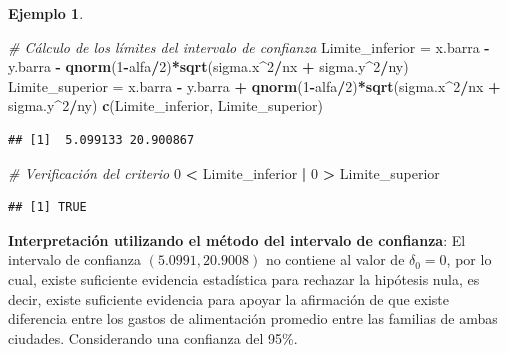 \documentclass[
  11pt,
]{book}
\newenvironment{Shaded}{\begin{snugshade}}{\end{snugshade}}
\newcommand{\CommentTok}[1]{\textcolor[rgb]{0.56,0.35,0.01}{\textit{#1}}}
\newcommand{\DecValTok}[1]{\textcolor[rgb]{0.00,0.00,0.81}{#1}}
\newcommand{\FunctionTok}[1]{\textcolor[rgb]{0.13,0.29,0.53}{\textbf{#1}}}
\newcommand{\NormalTok}[1]{#1}
\newcommand{\OtherTok}[1]{\textcolor[rgb]{0.56,0.35,0.01}{#1}}
\newcommand{\SpecialCharTok}[1]{\textcolor[rgb]{0.81,0.36,0.00}{\textbf{#1}}}
\theoremstyle{definition}
\theoremstyle{definition}
\newtheorem{example}{Ejemplo}[chapter]
\theoremstyle{definition}
\theoremstyle{definition}
\theoremstyle{remark}
\begin{document}
\begin{example}
\begin{enumerate}
\begin{Shaded}
\begin{Highlighting}[]
\CommentTok{\# Cálculo de los límites del intervalo de confianza}
\NormalTok{Limite\_inferior }\OtherTok{=}\NormalTok{ x.barra }\SpecialCharTok{{-}}\NormalTok{ y.barra }\SpecialCharTok{{-}} \FunctionTok{qnorm}\NormalTok{(}\DecValTok{1}\SpecialCharTok{{-}}\NormalTok{alfa}\SpecialCharTok{/}\DecValTok{2}\NormalTok{)}\SpecialCharTok{*}\FunctionTok{sqrt}\NormalTok{(sigma.x}\SpecialCharTok{\^{}}\DecValTok{2}\SpecialCharTok{/}\NormalTok{nx }\SpecialCharTok{+}\NormalTok{ sigma.y}\SpecialCharTok{\^{}}\DecValTok{2}\SpecialCharTok{/}\NormalTok{ny)}
\NormalTok{Limite\_superior }\OtherTok{=}\NormalTok{ x.barra }\SpecialCharTok{{-}}\NormalTok{ y.barra }\SpecialCharTok{+} \FunctionTok{qnorm}\NormalTok{(}\DecValTok{1}\SpecialCharTok{{-}}\NormalTok{alfa}\SpecialCharTok{/}\DecValTok{2}\NormalTok{)}\SpecialCharTok{*}\FunctionTok{sqrt}\NormalTok{(sigma.x}\SpecialCharTok{\^{}}\DecValTok{2}\SpecialCharTok{/}\NormalTok{nx }\SpecialCharTok{+}\NormalTok{ sigma.y}\SpecialCharTok{\^{}}\DecValTok{2}\SpecialCharTok{/}\NormalTok{ny)}
\FunctionTok{c}\NormalTok{(Limite\_inferior, Limite\_superior)}
\end{Highlighting}
\end{Shaded}

\begin{verbatim}
## [1]  5.099133 20.900867
\end{verbatim}

\begin{Shaded}
\begin{Highlighting}[]
\CommentTok{\# Verificación del criterio}
\DecValTok{0} \SpecialCharTok{\textless{}}\NormalTok{ Limite\_inferior }\SpecialCharTok{|} \DecValTok{0} \SpecialCharTok{\textgreater{}}\NormalTok{ Limite\_superior}
\end{Highlighting}
\end{Shaded}

\begin{verbatim}
## [1] TRUE
\end{verbatim}

  \textbf{Interpretación utilizando el método del intervalo de confianza}: El intervalo de confianza \((5.0991, 20.9008)\) no contiene al valor de \(\delta_0 = 0\), por lo cual, existe suficiente evidencia estadística para rechazar la hipótesis nula, es decir, existe suficiente evidencia para apoyar la afirmación de que existe diferencia entre los gastos de alimentación promedio entre las familias de ambas ciudades. Considerando una confianza del 95\%.
\end{enumerate}

\end{example}
\end{document}
